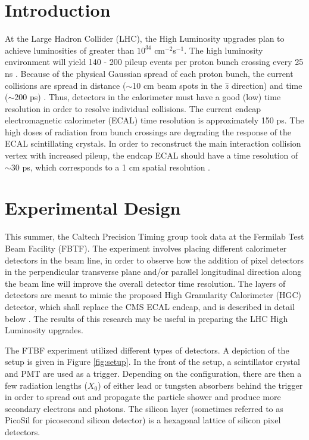 \documentclass[twocolumn,aps,prd,reprint,superscriptaddress,floatfix]{revtex4-1}
\begin{document}
\section{Introduction}
At the Large Hadron Collider (LHC), the High Luminosity upgrades plan to achieve luminosities of greater than $10^{34}$ cm$^{-2}$s$^{-1}$.
The high luminosity environment will yield 140 - 200 pileup events per proton bunch crossing every 25 ns \cite{P1}. 
Because of the physical Gaussian spread of each proton bunch, the current collisions are spread in distance ($\sim$10 cm beam spots in the $\hat{z}$ direction) and time ($\sim$200 ps) \cite{P1}.
Thus, detectors in the calorimeter must have a good (low) time resolution in order to resolve individual collisions. 
The current endcap electromagnetic calorimeter (ECAL) time resolution is approximately 150 ps.
The high doses of radiation from bunch crossings are degrading the response of the ECAL scintillating crystals.
In order to reconstruct the  main interaction collision vertex with increased pileup, the endcap ECAL should have a time resolution of $\sim$30 ps, which corresponds to a 1 cm spatial resolution \cite{P1}. 


\section{Experimental Design}
This summer, the Caltech Precision Timing group took data at the Fermilab Test Beam Facility (FBTF). 
The experiment involves placing different calorimeter detectors in the beam line, in order to observe how the addition of pixel detectors in the perpendicular transverse plane and/or parallel longitudinal direction along the beam line will improve the overall detector time resolution. 
The layers of detectors are meant to mimic the proposed High Granularity Calorimeter (HGC) detector, which shall replace the CMS ECAL endcap, and is described in detail below \cite{P2}. 
The results of this research may be useful in preparing the LHC High Luminosity upgrades.

The FTBF experiment utilized different types of detectors. 
A depiction of the setup is given in Figure \ref{fig:setup}.
In the front of the setup, a scintillator crystal and PMT are used as a trigger. 
Depending on the configuration, there are then a few radiation lengths ($X_0$) of either lead or tungsten absorbers behind the trigger in order to spread out and propagate the particle shower and produce more secondary electrons and photons. 
The silicon layer (sometimes referred to as PicoSil for picosecond silicon detector) is a hexagonal lattice of silicon pixel detectors.
\end{document}
